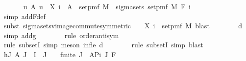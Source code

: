 \begin{isabellebody}
\ \ \ \ \isamarkupfalse%
\ {\isachardoublequoteopen}\ {\isacharbraceleft}{\kern0pt}u{\isachardot}{\kern0pt}\ {\isasymexists}A{\isachardot}{\kern0pt}\ u\ {\isacharequal}{\kern0pt}\ X\ i\ {\isacharminus}{\kern0pt}{\isacharbackquote}{\kern0pt}\ A\ {\isasyminter}\ set{\isacharunderscore}{\kern0pt}pmf\ M{\isacharbraceright}{\kern0pt}\ {\isacharequal}{\kern0pt}\ sigma{\isacharunderscore}{\kern0pt}sets\ {\isacharparenleft}{\kern0pt}set{\isacharunderscore}{\kern0pt}pmf\ M{\isacharparenright}{\kern0pt}\ {\isacharparenleft}{\kern0pt}F\ i{\isacharparenright}{\kern0pt}{\isachardoublequoteclose}\isanewline
\ \ \ \ \ \ \isamarkupfalse%
\ {\isacharparenleft}{\kern0pt}simp\ add{\isacharcolon}{\kern0pt}F{\isacharunderscore}{\kern0pt}def{\isacharparenright}{\kern0pt}\isanewline
\ \ \ \ \ \ \isamarkupfalse%
\ {\isacharparenleft}{\kern0pt}subst\ sigma{\isacharunderscore}{\kern0pt}sets{\isacharunderscore}{\kern0pt}vimage{\isacharunderscore}{\kern0pt}commute{\isacharbrackleft}{\kern0pt}symmetric{\isacharcomma}{\kern0pt}\ \ {\isasymOmega}{\isacharprime}{\kern0pt}\ {\isacharequal}{\kern0pt}\ {\isachardoublequoteopen}X\ i\ {\isacharbackquote}{\kern0pt}\ set{\isacharunderscore}{\kern0pt}pmf\ M{\isachardoublequoteclose}{\isacharbrackright}{\kern0pt}{\isacharcomma}{\kern0pt}\ blast{\isacharparenright}{\kern0pt}\isanewline
\ \ \ \ \ \ \isamarkupfalse%
\ d{}\ \isamarkupfalse%
\ {\isacharparenleft}{\kern0pt}simp\ add{\isacharcolon}{\kern0pt}g{\isacharparenright}{\kern0pt}\isanewline
\ \ \ \ \ \ \isamarkupfalse%
\ {\isacharparenleft}{\kern0pt}rule\ order{\isacharunderscore}{\kern0pt}antisym{\isacharparenright}{\kern0pt}\isanewline
\ \ \ \ \ \ \ \isamarkupfalse%
\ {\isacharparenleft}{\kern0pt}rule\ subsetI{\isacharcomma}{\kern0pt}\ simp{\isacharcomma}{\kern0pt}\ meson\ inf{\isacharunderscore}{\kern0pt}le{}\ d{}{\isacharparenright}{\kern0pt}\isanewline
\ \ \ \ \ \ \isamarkupfalse%
\ {\isacharparenleft}{\kern0pt}rule\ subsetI{\isacharcomma}{\kern0pt}\ simp{\isacharcomma}{\kern0pt}\ blast{\isacharparenright}{\kern0pt}\isanewline
\ \ \isamarkupfalse%
\isanewline
\isanewline
\ \ \isamarkupfalse%
\ h{\isacharcolon}{\kern0pt}{\isachardoublequoteopen}{\isasymAnd}J\ A{\isachardot}{\kern0pt}\ J\ {\isasymsubseteq}\ I\ {\isasymLongrightarrow}\ J\ {\isasymnoteq}\ {\isacharbraceleft}{\kern0pt}{\isacharbraceright}{\kern0pt}\ {\isasymLongrightarrow}\ finite\ J\ {\isasymLongrightarrow}\ A{\isasymin}Pi\ J\ F\ {\isasymLongrightarrow}\isanewline

\end{isabellebody}
